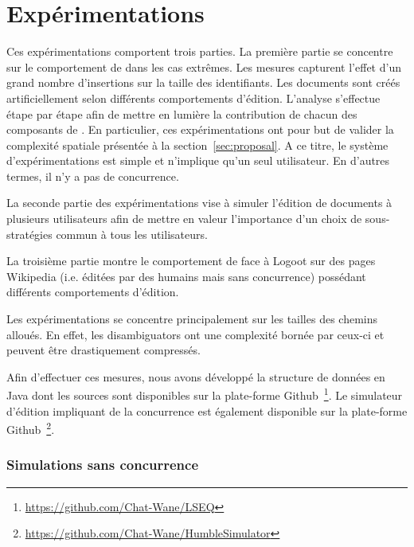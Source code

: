 
\section{Expérimentations}

\label{lseq:sec:experiments}

Ces expérimentations comportent trois parties. La première partie se concentre
sur le comportement de \LSEQ dans les cas extrêmes. Les mesures capturent
l'effet d'un grand nombre d'insertions sur la taille des identifiants. Les
documents sont créés artificiellement selon différents comportements d'édition.
L'analyse s'effectue étape par étape afin de mettre en lumière la contribution
de chacun des composants de \LSEQ. En particulier, ces expérimentations ont pour
but de valider la complexité spatiale présentée à la section~\ref{sec:proposal}.
A ce titre, le système d'expérimentations est simple et n'implique qu'un seul
utilisateur. En d'autres termes, il n'y a pas de concurrence.


La seconde partie des expérimentations vise à simuler l'édition de documents à
plusieurs utilisateurs afin de mettre en valeur l'importance d'un choix de
sous-stratégies commun à tous les utilisateurs.

La troisième partie montre le comportement de \LSEQ face à Logoot sur des pages
Wikipedia (i.e. éditées par des humains mais sans concurrence) possédant
différents comportements d'édition.

Les expérimentations se concentre principalement sur les tailles des chemins
alloués. En effet, les disambiguators ont une complexité bornée par ceux-ci et
peuvent être drastiquement compressés.

Afin d'effectuer ces mesures, nous avons développé la structure de données \LSEQ
en Java dont les sources sont disponibles sur la plate-forme
Github~\footnote{\url{https://github.com/Chat-Wane/LSEQ}}. Le simulateur
d'édition impliquant de la concurrence est également disponible sur la
plate-forme
Github~\footnote{\url{https://github.com/Chat-Wane/HumbleSimulator}}.


\subsubsection{Simulations sans concurrence}

